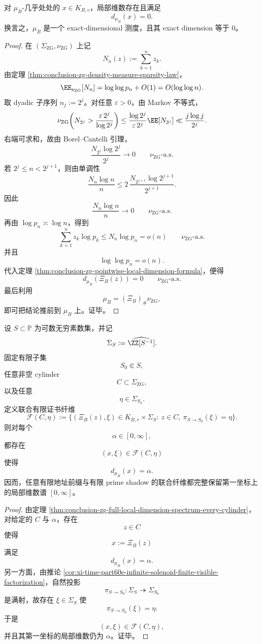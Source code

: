 \begin{theorem}\label{thm:conclusion-zg-pushforward-exact-dimension-zero}
对 \(\mu_B\)-几乎处处的 \(x\in K_{B,v}\)，局部维数存在且满足
\[
d_{\mu_B}(x)=0.
\]
换言之，\(\mu_B\) 是一个 exact-dimensional 测度，且其 exact dimension 等于 \(0\)。
\end{theorem}
\begin{proof}
在 \((\Sigma_{\mathrm{ZG}},\nu_{\mathrm{ZG}})\) 上记
\[
N_n(z):=\sum_{k=1}^{n}z_k.
\]
由定理 \ref{thm:conclusion-zg-density-measure-sparsity-law}，
\[
\EE_{\nu_{\mathrm{ZG}}}[N_n]
=
\log\log p_n+O(1)
=
O(\log\log n).
\]
取 dyadic 子序列 \(n_j:=2^j\)。对任意 \(\varepsilon>0\)，由 Markov 不等式，
\[
\nu_{\mathrm{ZG}}\!\left(
N_{2^j}>\frac{\varepsilon\,2^j}{\log 2^j}
\right)
\le
\frac{\log 2^j}{\varepsilon\,2^j}\EE[N_{2^j}]
\ll
\frac{j\log j}{2^j}.
\]
右端可求和，故由 Borel--Cantelli 引理，
\[
\frac{N_{2^j}\log 2^j}{2^j}\longrightarrow 0
\qquad
\nu_{\mathrm{ZG}}\text{-a.s.}
\]
若 \(2^j\le n<2^{j+1}\)，则由单调性
\[
\frac{N_n\log n}{n}
\le
2\,
\frac{N_{2^{j+1}}\log 2^{j+1}}{2^{j+1}}.
\]
因此
\[
\frac{N_n\log n}{n}\longrightarrow 0
\qquad
\nu_{\mathrm{ZG}}\text{-a.s.}
\]
再由 \(\log p_n\asymp \log n\)，得到
\[
\sum_{k=1}^{n}z_k\log p_k
\le
N_n\log p_n
=
o(n)
\qquad
\nu_{\mathrm{ZG}}\text{-a.s.}
\]
并且
\[
\log\log p_n=o(n).
\]
代入定理 \ref{thm:conclusion-zg-pointwise-local-dimension-formula}，便得
\[
d_{\mu_B}(\Xi_B(z))=0
\qquad
\nu_{\mathrm{ZG}}\text{-a.s.}
\]
最后利用
\[
\mu_B=(\Xi_B)_\#\nu_{\mathrm{ZG}},
\]
即可把结论推前到 \(\mu_B\) 上。证毕。
\end{proof}

\begin{theorem}\label{thm:conclusion-zg-finite-certificate-fiber-full-spectrum}
设 \(S\subset\mathbb P\) 为可数无穷素数集，并记
\[
\Sigma_S:=\widehat{\ZZ[S^{-1}]}.
\]
固定有限子集
\[
S_0\Subset S,
\]
任意非空 cylinder
\[
C\subset \Sigma_{\mathrm{ZG}},
\]
以及任意
\[
\eta\in \Sigma_{S_0}.
\]
定义联合有限证书纤维
\[
\mathcal F(C,\eta)
:=
\{(\Xi_B(z),\xi)\in K_{B,v}\times \Sigma_S:\ z\in C,\ \pi_{S\to S_0}(\xi)=\eta\}.
\]
则对每个
\[
\alpha\in[0,\infty],
\]
都存在
\[
(x,\xi)\in \mathcal F(C,\eta)
\]
使得
\[
d_{\mu_B}(x)=\alpha.
\]
因而，任意有限地址前缀与有限 prime shadow 的联合纤维都完整保留第一坐标上的局部维数谱 \([0,\infty]\)。
\end{theorem}
\begin{proof}
由定理 \ref{thm:conclusion-zg-full-local-dimension-spectrum-every-cylinder}，对给定的 \(C\) 与 \(\alpha\)，存在
\[
z\in C
\]
使得
\[
x:=\Xi_B(z)
\]
满足
\[
d_{\mu_B}(x)=\alpha.
\]
另一方面，由推论 \ref{cor:xi-time-part60e-infinite-solenoid-finite-visible-factorization}，自然投影
\[
\pi_{S\to S_0}:\Sigma_S\twoheadrightarrow \Sigma_{S_0}
\]
是满射，故存在 \(\xi\in \Sigma_S\) 使
\[
\pi_{S\to S_0}(\xi)=\eta.
\]
于是
\[
(x,\xi)\in \mathcal F(C,\eta),
\]
并且其第一坐标的局部维数仍为 \(\alpha\)。证毕。
\end{proof}

